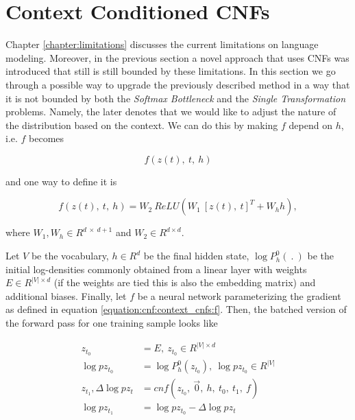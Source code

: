 \section{Context Conditioned CNFs}
\label{section:cnf_lm:context_cnfs}

Chapter \ref{chapter:limitations} discusses the current limitations on language modeling. Moreover, in the previous section a novel approach that uses CNFs was introduced that still is still bounded by these limitations. In this section we go through a possible way to upgrade the previously described method in a way that it is not bounded by both the \emph{Softmax Bottleneck} and the \emph{Single Transformation} problems. Namely, the later denotes that we would like to adjust the nature of the distribution based on the context. We can do this by making $ f $ depend on $ h $, i.e. $ f $ becomes

\begin{displaymath}
    f(z(t), \ t, \ h)
\end{displaymath}

and one way to define it is

\begin{equation}
    \label{equation:cnf:context_cnfs:f}
    f(z(t), \ t, \ h) = W_2 \ ReLU(W_1 \ [z(t), \ t]^T + W_h h),
\end{equation}

where $ W_1, W_h \in R^{d \ \times \ d+1} $ and $ W_2 \in R^{d \times d} $.

Let $ V $ be the vocabulary, $ h \in R^d $ be the final hidden state, $ \log P_h^0(\ . \ ) $ be the initial log-densities commonly obtained from a linear layer with weights $ E \in R^{|V| \times d} $ (if the weights are tied \citep{inan2016tying} this is also the embedding matrix) and additional biases. Finally, let $ f $ be a neural network parameterizing the gradient as defined in equation \ref{equation:cnf:context_cnfs:f}. Then, the batched version of the forward pass for one training sample looks like

\begin{align}
    \label{equation:cnf_lm:cnfh_lm_1}
    z_{t_0} &= E , \ z_{t_0} \in R^{|V| \times d} \\
    \label{equation:cnf_lm:cnfh_lm_2}
    \log pz_{t_0} &= \log P_h^0(z_{t_0}), \ \log pz_{t_0} \in R^{|V|} \\
    \label{equation:cnf_lm:cnfh_lm_3}
    z_{t_1}, \Delta \log pz_t &= cnf(z_{t_0}, \ \vec{0}, \ h, \ t_0 , \ t_1 , \ f) \\
    \label{equation:cnf_lm:cnfh_lm_4}
    \log pz_{t_1} &= \log pz_{t_0} -  \Delta \log  pz_t
\end{align}

